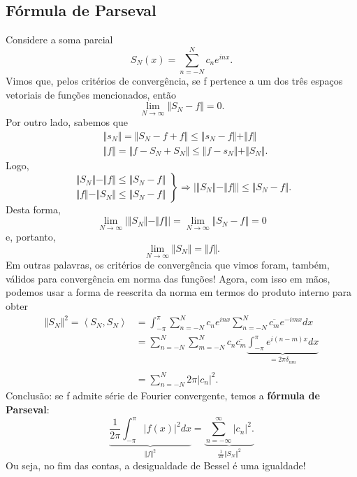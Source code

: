 \documentclass[../pde_notes.tex]{subfiles}
\begin{document}
\subsection{Fórmula de Parseval}
Considere a soma parcial
\[
	S_{N}(x)=\sum\limits_{n=-N}^{N}c_{n}e^{inx}.
\]
Vimos que, pelos critérios de convergência, se f pertence a um dos três espaços vetoriais de funções mencionados, então
\[
	\lim_{N\to \infty}\Vert S_{N}-f \Vert=0.
\]
Por outro lado, sabemos que
\begin{align*}
	 & \Vert s_{N} \Vert=\Vert S_{N}-f+f \Vert\leq \Vert s_{N}-f \Vert+\Vert f \Vert      \\
	 & \Vert f \Vert=\Vert f-S_{N}+S_{N} \Vert\leq \Vert f-s_{N} \Vert+\Vert S_{N} \Vert.
\end{align*}
Logo,
\[
	\left.\begin{array}{ll}
		\Vert S_{N} \Vert-\Vert f \Vert\leq \Vert S_{N}-f \Vert \\
		\Vert f \Vert-\Vert S_{N} \Vert\leq \Vert S_{N}-f \Vert
	\end{array}\right\} \Rightarrow \biggl\vert \Vert S_{N} \Vert-\Vert f \Vert \biggr\vert \leq \Vert S_{N}-f \Vert.
\]
Desta forma,
\[
	\lim_{N\to \infty} \biggl\vert \Vert S_{N} \Vert - \Vert f \Vert \biggr\vert=\lim_{N\to \infty}\Vert S_{N}-f \Vert=0
\]
e, portanto,
\[
	\lim_{N\to \infty}\Vert S_{N} \Vert=\Vert f \Vert.
\]
Em outras palavras, os critérios de convergência que vimos foram, também, válidos para convergência em norma das funções! Agora, com isso em mãos, podemos usar a forma de reescrita da norma em termos do produto interno para obter
\begin{align*}
	\Vert S_{N} \Vert ^{2}=\left< S_{N}, S_{N} \right> & = \int_{-\pi }^{\pi }\sum\limits_{n=-N}^{N}c_{n}e^{inx}\sum\limits_{n=-N}^{N}\overline{c_{m}}e^{-imx}dx                              \\
	                                                   & = \sum\limits_{n=-N}^{N}\sum\limits_{m=-N}^{N}c_{n}\overline{c_{m}}\underbrace{\int_{-\pi }^{\pi }e^{i(n-m)x}dx}_{=2\pi \delta_{nm}} \\
	\\
	                                                   & =\sum\limits_{n=-N}^{N}2\pi |c_{n}|^{2}.
\end{align*}
Conclusão: se f admite série de Fourier convergente, temos a \textbf{fórmula de Parseval}:
\hypertarget{parseval_formula}{
\[
	\underbrace{\frac{1}{2\pi }\int_{-\pi }^{\pi }|f(x)|^{2}dx}_{\Vert f \Vert^{2}} = \underbrace{\sum\limits_{n=-\infty}^{\infty}|c_{n}|^{2}.}_{\frac{1}{2\pi }\Vert S_{N} \Vert^{2}}
\]
}
Ou seja, no fim das contas, a desigualdade de Bessel é uma igualdade!
\end{document}

